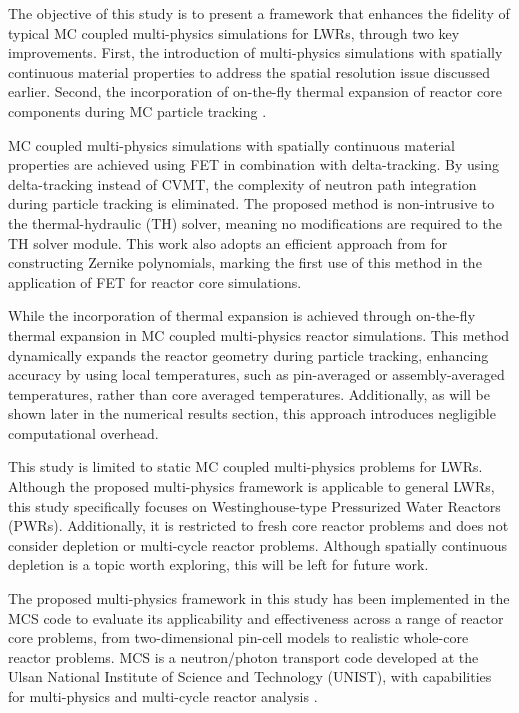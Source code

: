 The objective of this study is to present a framework that enhances the fidelity of typical MC coupled multi-physics simulations for LWRs, through two key improvements. First, the introduction of multi-physics simulations with spatially continuous material properties \cite{imron_2024} to address the spatial resolution issue discussed earlier. Second, the incorporation of on-the-fly thermal expansion of reactor core components during MC particle tracking \cite{imron_otf}.

MC coupled multi-physics simulations with spatially continuous material properties are achieved using FET in combination with delta-tracking. By using delta-tracking instead of CVMT, the complexity of neutron path integration during particle tracking is eliminated. The proposed method is non-intrusive to the thermal-hydraulic (TH) solver, meaning no modifications are required to the TH solver module. This work also adopts an efficient approach from \cite{honarvar} for constructing Zernike polynomials, marking the first use of this method in the application of FET for reactor core simulations.

While the incorporation of thermal expansion is achieved through on-the-fly thermal expansion in MC coupled multi-physics reactor simulations. This method dynamically expands the reactor geometry during particle tracking, enhancing accuracy by using local temperatures, such as pin-averaged or assembly-averaged temperatures, rather than core averaged temperatures. Additionally, as will be shown later in the numerical results section, this approach introduces negligible computational overhead.

This study is limited to static MC coupled multi-physics problems for LWRs. Although the proposed multi-physics framework is applicable to general LWRs, this study specifically focuses on Westinghouse-type Pressurized Water Reactors (PWRs). Additionally, it is restricted to fresh core reactor problems and does not consider depletion or multi-cycle reactor problems. Although spatially continuous depletion is a topic worth exploring, this will be left for future work.

The proposed multi-physics framework in this study has been implemented in the MCS code \cite{hlee_2020} to evaluate its applicability and effectiveness across a range of reactor core problems, from two-dimensional pin-cell models to realistic whole-core reactor problems. MCS is a neutron/photon transport code developed at the Ulsan National Institute of Science and Technology (UNIST), with capabilities for multi-physics and multi-cycle reactor analysis \cite{hlee_2017, yu_2019, yu_2020}.


